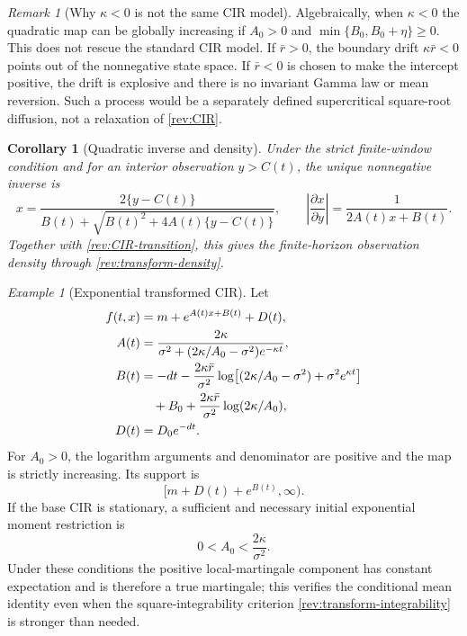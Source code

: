 \documentclass[11pt]{article}
\newtheorem{corollary}[definition]{Corollary}
\theoremstyle{remark}
\newtheorem{remark}[definition]{Remark}
\newtheorem{example}[definition]{Example}
\begin{document}
\begin{remark}[Why $\kappa<0$ is not the same CIR model]
Algebraically, when $\kappa<0$ the quadratic map can be globally increasing if
$A_0>0$ and $\min\{B_0,B_0+\eta\}\ge0$.  This does not rescue the standard CIR
model.  If $\bar r>0$, the boundary drift $\kappa\bar r<0$ points out of the
nonnegative state space.  If $\bar r<0$ is chosen to make the intercept positive,
the drift is explosive and there is no invariant Gamma law or mean reversion.
Such a process would be a separately defined supercritical square-root diffusion,
not a relaxation of \eqref{rev:CIR}.
\end{remark}

\begin{corollary}[Quadratic inverse and density]
\label{rev:cor-quadratic-inverse}
Under the strict finite-window condition and for an interior observation
$y>C(t)$, the unique nonnegative inverse is
\begin{equation}
x=\frac{2\{y-C(t)\}}
{B(t)+\sqrt{B(t)^2+4A(t)\{y-C(t)\}}},
\qquad
\left|\frac{\partial x}{\partial y}\right|
=\frac1{2A(t)x+B(t)}.
\label{rev:quadratic-inverse}
\end{equation}
Together with \eqref{rev:CIR-transition}, this gives the finite-horizon
observation density through \eqref{rev:transform-density}.
\end{corollary}

\begin{example}[Exponential transformed CIR]
\label{rev:ex-exponential-CIR}
Let
\begin{align}
f(t,x)&=m+e^{A(t)x+B(t)}+D(t),\label{rev:exp-CIR-transform}\\
A(t)&=\frac{2\kappa}
{\sigma^2+(2\kappa/A_0-\sigma^2)e^{-\kappa t}},
\label{rev:exp-CIR-A}\\
B(t)&=-dt-\frac{2\kappa\bar r}{\sigma^2}
\log\!\left[(2\kappa/A_0-\sigma^2)+\sigma^2e^{\kappa t}\right]
\notag\\
&\quad+B_0+
\frac{2\kappa\bar r}{\sigma^2}\log(2\kappa/A_0),
\label{rev:exp-CIR-B}\\
D(t)&=D_0e^{-dt}.
\label{rev:exp-CIR-D}
\end{align}
For $A_0>0$, the logarithm arguments and denominator are positive and the map
is strictly increasing.  Its support is
\begin{equation}
[m+D(t)+e^{B(t)},\infty).
\label{rev:exp-CIR-support}
\end{equation}
If the base CIR is stationary, a sufficient and necessary initial exponential
moment restriction is
\begin{equation}
0<A_0<\frac{2\kappa}{\sigma^2}.
\label{rev:exp-CIR-moment}
\end{equation}
Under these conditions the positive local-martingale component has constant
expectation and is therefore a true martingale; this verifies the conditional
mean identity even when the square-integrability criterion
\eqref{rev:transform-integrability} is stronger than needed.
\end{example}
\end{document}

